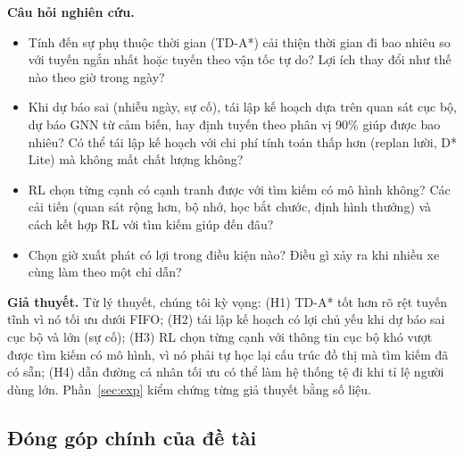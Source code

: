 \textbf{Câu hỏi nghiên cứu.}
\begin{itemize}
    \item[\textbf{RQ1.}] Tính đến sự phụ thuộc thời gian (TD-A*) cải thiện thời gian đi bao nhiêu so với tuyến ngắn nhất
    hoặc tuyến theo vận tốc tự do? Lợi ích thay đổi như thế nào theo giờ trong ngày?
    \item[\textbf{RQ2.}] Khi dự báo sai (nhiễu ngày, sự cố), tái lập kế hoạch dựa trên quan sát cục bộ, dự báo GNN từ cảm
    biến, hay định tuyến theo phân vị 90\% giúp được bao nhiêu? Có thể tái lập kế hoạch với chi phí tính toán thấp hơn
    (replan lười, D* Lite) mà không mất chất lượng không?
    \item[\textbf{RQ3.}] RL chọn từng cạnh có cạnh tranh được với tìm kiếm có mô hình không? Các cải tiến (quan sát rộng
    hơn, bộ nhớ, học bắt chước, định hình thưởng) và cách kết hợp RL với tìm kiếm giúp đến đâu?
    \item[\textbf{RQ4.}] Chọn giờ xuất phát có lợi trong điều kiện nào? Điều gì xảy ra khi nhiều xe cùng làm theo một
    chỉ dẫn?
\end{itemize}

\textbf{Giả thuyết.} Từ lý thuyết, chúng tôi kỳ vọng: (H1) TD-A* tốt hơn rõ rệt tuyến tĩnh vì nó tối ưu dưới FIFO;
(H2) tái lập kế hoạch có lợi chủ yếu khi dự báo sai cục bộ và lớn (sự cố); (H3) RL chọn từng cạnh với thông tin cục bộ
khó vượt được tìm kiếm có mô hình, vì nó phải tự học lại cấu trúc đồ thị mà tìm kiếm đã có sẵn; (H4) dẫn đường cá nhân
tối ưu có thể làm hệ thống tệ đi khi tỉ lệ người dùng lớn. Phần~\ref{sec:exp} kiểm chứng từng giả thuyết bằng số liệu.

\subsection{Đóng góp chính của đề tài}\label{sec:intro:contrib}

